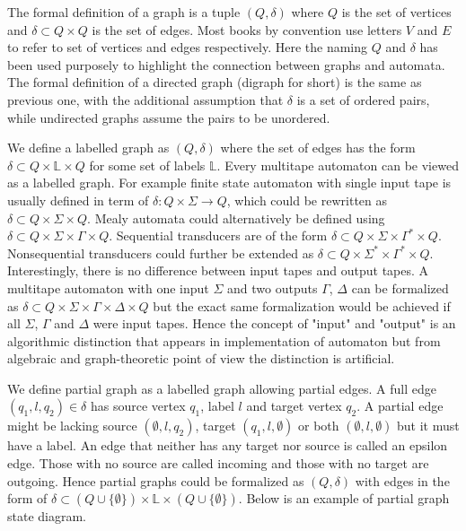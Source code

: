 The formal definition of a graph is a tuple $(Q,\delta)$ where $Q$ is the  set of vertices and $\delta\subset Q\times Q$ is the set of edges. Most books by convention use letters $V$ and $E$ to refer to set of vertices and edges respectively. Here the naming $Q$ and $\delta$ has been used purposely to highlight the connection between graphs and automata. The formal definition of a directed graph (digraph for short) is the same as previous one, with the additional assumption that $\delta$ is a set of ordered pairs, while undirected graphs assume the pairs to be unordered. 

We define a labelled graph as $(Q,\delta)$ where the set of edges has the form  $\delta \subset Q \times \mathbb{L} \times Q$ for some set of labels $\mathbb{L}$. Every multitape automaton can be viewed as a labelled graph. For example finite state automaton with single input tape is usually defined in term of $\delta : Q \times \Sigma \rightarrow Q $, which could be rewritten as $\delta \subset Q \times \Sigma \times Q$. Mealy automata could alternatively be defined using $\delta \subset Q \times \Sigma \times \Gamma \times Q$. Sequential transducers are of the form $\delta \subset Q \times \Sigma \times \Gamma^* \times Q$. Nonsequential transducers could further be extended as $\delta \subset Q \times \Sigma^* \times \Gamma^* \times Q$. Interestingly, there is no difference between input tapes and output tapes. A multitape automaton with one input  $\Sigma$ and two outputs $\Gamma$, $\Delta$ can be formalized as $\delta \subset Q \times \Sigma \times \Gamma \times \Delta \times Q$ but the exact same formalization would be achieved if all $\Sigma$, $\Gamma$ and $\Delta$ were input tapes. Hence the concept of "input" and "output" is an algorithmic distinction that appears in implementation of automaton but from algebraic and graph-theoretic point of view the distinction is artificial. 

We define partial graph as a labelled graph allowing partial edges. A full edge $(q_1,l,q_2) \in \delta$ has source vertex $q_1$, label $l$ and target vertex $q_2$. A partial edge might be lacking source $(\emptyset,l,q_2)$, target $(q_1,l,\emptyset)$ or both $(\emptyset,l,\emptyset)$ but it must have a label. An edge  that neither has any target nor source is called an epsilon edge. Those with no source are called incoming and those with no target are outgoing. Hence partial graphs could be formalized as $(Q,\delta)$ with edges in the form of $\delta \subset (Q \cup \{\emptyset\}) \times \mathbb{L} \times  (Q \cup \{\emptyset\})$. Below is an example of partial graph state diagram.


